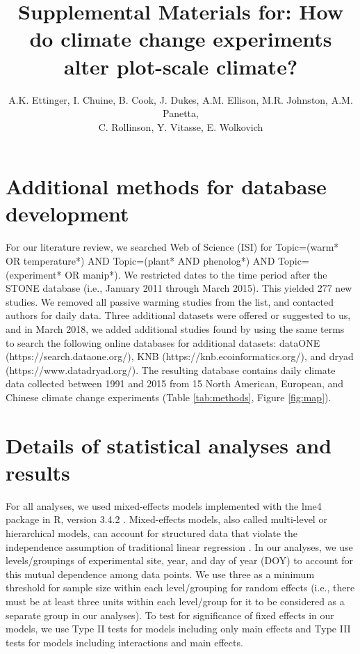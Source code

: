 \documentclass{article}
\begin{document}

\title{Supplemental Materials for: How do climate change experiments alter plot-scale climate?} 

\author{A.K. Ettinger, I. Chuine, B. Cook, J. Dukes, A.M. Ellison, M.R. Johnston, A.M. Panetta,\\ C. Rollinson, Y. Vitasse, E. Wolkovich}
\maketitle  %
\renewcommand{\thetable}{S\arabic{table}}
\renewcommand{\thefigure}{S\arabic{figure}}

\section* {Additional methods for database development}
For our literature review, we searched Web of Science (ISI) for Topic=(warm* OR temperature*) AND Topic=(plant* AND phenolog*) AND Topic=(experiment* OR manip*). We restricted dates to the time period after the STONE database (i.e., January 2011 through March 2015). This yielded 277 new studies. We removed all passive warming studies from the list, and contacted authors for daily data. Three additional datasets were offered or suggested to us, and in March 2018, we added additional studies found by using the same terms to search the following online databases for additional datasets: dataONE (https://search.dataone.org/), KNB (https://knb.ecoinformatics.org/), and dryad (https://www.datadryad.org/). The resulting database contains daily climate data collected between 1991 and 2015 from 15 North American, European, and Chinese climate change experiments (Table \ref{tab:methods}, Figure \ref{fig:map}). %

\section* {Details of statistical analyses and results}
For all analyses, we used mixed-effects models implemented with the lme4 package in R, version 3.4.2 \citep{bates2015,rcoreteam2017}. Mixed-effects models, also called multi-level or hierarchical models, can account for structured data that violate the independence assumption of traditional linear regression \citep{gelman2007}. In our analyses, we use levels/groupings of experimental site, year, and day of year (DOY) to account for this mutual dependence among data points. We use three as a minimum threshold for sample size within each level/grouping for random effects (i.e., there must be at least three units within each level/group for it to be considered as a separate group in our analyses). To test for significance of fixed effects in our models, we use Type II tests for models including only main effects and Type III tests for models including interactions and main effects. 
\end{document}
